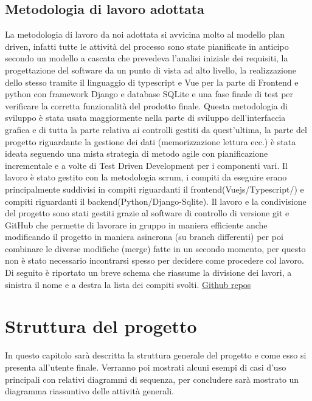 \documentclass[ 4paper,11pt,openany]{book}
\begin{document}
\section{Metodologia di lavoro adottata}
La metodologia di lavoro da noi adottata si avvicina molto al modello plan driven, infatti tutte le attività del processo sono state pianificate in anticipo secondo un modello a cascata che prevedeva l'analisi iniziale dei requisiti, la progettazione del software da un punto di vista ad alto livello, la realizzazione dello stesso tramite il linguaggio di typescript e Vue per la parte di Frontend e python con framework Django e database SQLite e una fase finale di test per verificare la corretta funzionalità del prodotto finale.
Questa metodologia di sviluppo è stata usata maggiormente nella parte di sviluppo dell'interfaccia grafica e di tutta la parte relativa ai controlli gestiti da quest'ultima, la parte del progetto riguardante la gestione dei dati (memorizzazione lettura ecc.) è stata ideata seguendo una mista strategia di metodo agile con pianificazione incrementale e a volte di Test Driven Development per i componenti vari. Il lavoro è stato gestito con la metodologia scrum, i compiti da eseguire erano principalmente suddivisi in compiti riguardanti il frontend(Vuejs/Typescript/) e compiti riguardanti il backend(Python/Django-Sqlite). 
Il lavoro e la condivisione del progetto sono stati gestiti grazie al software di controllo di versione git e GitHub che permette di lavorare in gruppo in maniera efficiente anche modificando il progetto in maniera asincrona (su branch differenti) per poi combinare le diverse modifiche (merge) fatte in un secondo momento, per questo non è stato necessario incontrarsi spesso per decidere come procedere col lavoro.  Di seguito è riportato un breve schema che riassume la divisione dei lavori, a sinistra il nome e a destra la lista dei compiti svolti. \href{https://github.com/Job-Searching-Webpage}{Github repos}
\clearpage


\chapter{Struttura del progetto}
In questo capitolo sarà descritta la struttura generale del progetto e come esso si presenta all'utente finale. Verranno poi mostrati alcuni esempi di casi d'uso principali con relativi diagrammi di sequenza, per concludere sarà mostrato un diagramma riassuntivo delle attività generali.
\end{document}
